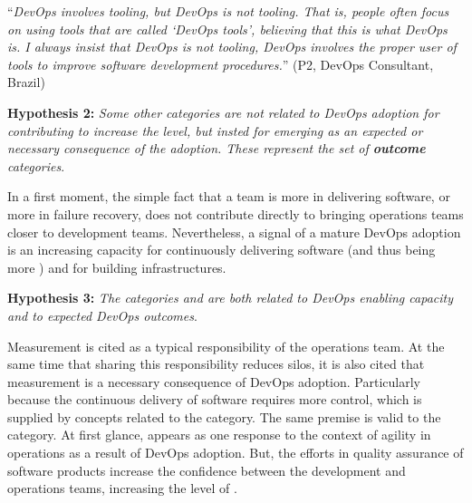\begin{mq}
``\emph{DevOps involves tooling, but DevOps is not tooling. That is, people often
focus on using tools that are called `DevOps tools', believing that this is
what DevOps is. I always insist that DevOps is not tooling, DevOps involves the
proper user of tools to improve software development procedures.}'' (P2, DevOps
Consultant, Brazil)
\end{mq}

\begin{mh}
\textbf{Hypothesis 2:} \textit{Some other categories are not related to DevOps
adoption for contributing to increase the} \cc \emph{level, but insted for emerging
as an expected or necessary consequence of the adoption. These 
represent the set of \textbf{outcome} categories}.
\end{mh}

In a first moment, the simple fact that a team is more
 in delivering software, or more  in failure recovery, does not
contribute directly to bringing operations teams closer to development teams.
Nevertheless, a signal of a mature DevOps adoption is an increasing capacity for continuously
delivering software (and thus being more )
and for building  infrastructures. 

\begin{mh}
\textbf{Hypothesis 3:} \textit{The categories  and 
  are both related to DevOps enabling capacity and to expected
  DevOps outcomes}.
\end{mh}

Measurement is cited as a typical responsibility of the operations team.
At the same time that sharing this responsibility reduces silos,
it is also cited that measurement is a necessary consequence of DevOps adoption. Particularly because
the continuous delivery of software requires more control,
which is supplied by concepts related to the  category.
The same premise is valid to the  category. At first glance,
 appears as one response to the context of agility in operations
as a result of DevOps adoption. But, the efforts in quality assurance of software products
increase the confidence between the development and operations teams, increasing the level
of \cc.

